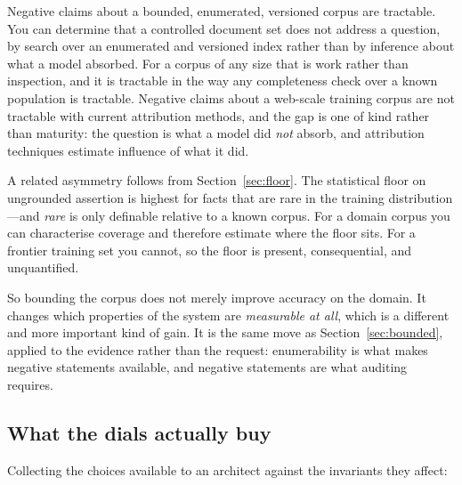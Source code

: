 Negative claims about a bounded, enumerated, versioned corpus are tractable. You can
determine that a controlled document set does not address a question, by search over
an enumerated and versioned index rather than by inference about what a model
absorbed. For a corpus of any size that is work rather than inspection, and it is
tractable in the way any completeness check over a known population is tractable. Negative claims about a web-scale training corpus are not
tractable with current attribution methods, and the gap is one of kind rather than
maturity: the question is what a model did \emph{not} absorb, and attribution
techniques estimate influence of what it did.

A related asymmetry follows from Section~\ref{sec:floor}. The statistical floor on
ungrounded assertion is highest for facts that are rare in the training
distribution---and \emph{rare} is only definable relative to a known corpus. For a
domain corpus you can characterise coverage and therefore estimate where the floor
sits. For a frontier training set you cannot, so the floor is present, consequential,
and unquantified.

So bounding the corpus does not merely improve accuracy on the domain. It changes
which properties of the system are \emph{measurable at all}, which is a different and
more important kind of gain. It is the same move as
Section~\ref{sec:bounded}, applied to the evidence rather than the request:
enumerability is what makes negative statements available, and negative statements
are what auditing requires.

\subsection{What the dials actually buy}

Collecting the choices available to an architect against the invariants they affect:

